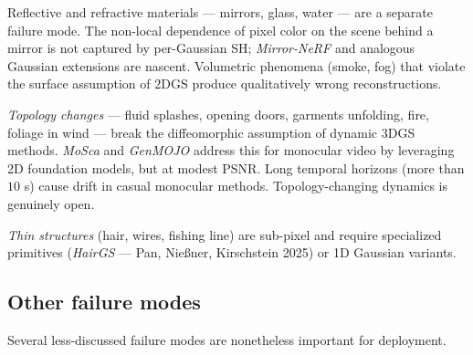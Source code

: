 Reflective and refractive materials --- mirrors, glass, water --- are a separate failure mode. The non-local dependence of pixel color on the scene behind a mirror is not captured by per-Gaussian SH; \emph{Mirror-NeRF} and analogous Gaussian extensions are nascent. Volumetric phenomena (smoke, fog) that violate the surface assumption of 2DGS produce qualitatively wrong reconstructions.

\emph{Topology changes} --- fluid splashes, opening doors, garments unfolding, fire, foliage in wind --- break the diffeomorphic assumption of dynamic 3DGS methods. \emph{MoSca} and \emph{GenMOJO} address this for monocular video by leveraging 2D foundation models, but at modest PSNR. Long temporal horizons (more than \(10\) s) cause drift in casual monocular methods. Topology-changing dynamics is genuinely open.

\emph{Thin structures} (hair, wires, fishing line) are sub-pixel and require specialized primitives (\emph{HairGS} --- Pan, Nießner, Kirschstein 2025) or 1D Gaussian variants.

\subsection{Other failure modes}\label{other-failure-modes}

Several less-discussed failure modes are nonetheless important for deployment.

